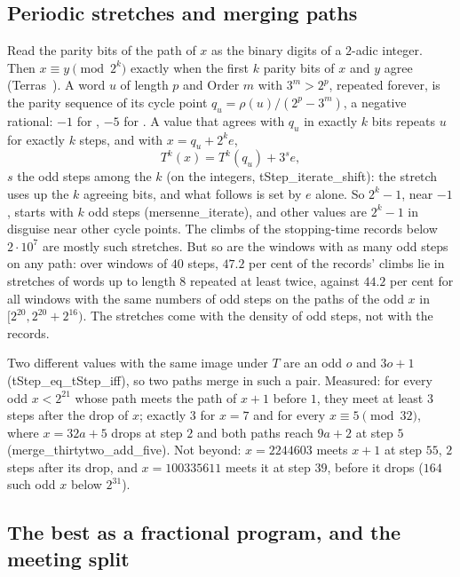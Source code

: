 \documentclass[10pt,a4paper,titlepage]{article}
\newcommand{\lean}[1]{\textsf{#1}}
\begin{document}
\subsection*{Periodic stretches and merging paths}

Read the parity bits of the path of $x$ as the binary digits of a $2$-adic integer. Then
$x \equiv y \pmod{2^k}$ exactly when the first $k$ parity bits of $x$ and $y$ agree
(Terras~\cite{Terras1976}). A word $u$ of length $p$ and Order $m$ with $3^m > 2^p$, repeated
forever, is the parity sequence of its cycle point $q_u = \rho(u)/(2^p - 3^m)$, a negative
rational: $-1$ for , $-5$ for . A value that agrees with $q_u$ in exactly $k$
bits repeats $u$ for exactly $k$ steps, and with $x = q_u + 2^k e$,
\[
T^k(x) = T^k(q_u) + 3^s e ,
\]
$s$ the odd steps among the $k$ (on the integers, \lean{tStep\_iterate\_shift}): the stretch
uses up the $k$ agreeing bits, and what follows is set by $e$ alone. So $2^k - 1$, near $-1$,
starts with $k$ odd steps (\lean{mersenne\_iterate}), and other values are $2^k - 1$ in
disguise near other cycle points. The climbs of the stopping-time records below
$2 \cdot 10^7$ are mostly such stretches. But so are the windows with as many odd steps on
any path: over windows of $40$ steps, $47.2$ per cent of the records' climbs lie in
stretches of words up to length $8$ repeated at least twice, against $44.2$ per cent for all
windows with the same numbers of odd steps on the paths of the odd $x$ in
$[2^{20}, 2^{20} + 2^{16})$. The stretches come with the density of odd steps, not with the records.

{\sloppy %
Two different values with the same image under $T$ are an odd $o$ and $3o + 1$
(\lean{tStep\_eq\_tStep\_iff}), so two paths merge in such a pair. Measured: for every odd
$x < 2^{21}$ whose path meets the path of $x + 1$ before $1$, they meet at least $3$ steps after the
drop of $x$; exactly $3$ for $x = 7$ and for every $x \equiv 5 \pmod{32}$, where $x = 32a + 5$
drops at step $2$ and both paths reach $9a + 2$ at step $5$ (\lean{merge\_thirtytwo\_add\_five}).
Not beyond: $x = 2244603$ meets $x + 1$ at step $55$, $2$ steps after its drop, and
$x = 100335611$ meets it at step $39$, before it drops ($164$ such odd $x$ below $2^{31}$).\par}

\subsection*{The best as a fractional program, and the meeting split}
\end{document}
